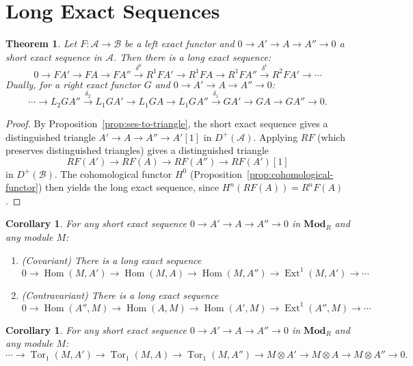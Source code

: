 \documentclass[a4paper,12pt]{book}
\DeclareMathOperator{\Hom}{Hom}
\newcommand{\Mod}{\mathbf{Mod}}
\theoremstyle{definition}
\theoremstyle{plain}
\newtheorem{theorem}[definition]{Theorem}
\newtheorem{corollary}[definition]{Corollary}
\theoremstyle{remark}
\begin{document}
\section{Long Exact Sequences}\label{sec:long-exact-derived}

\begin{theorem}\label{thm:les-derived}
Let $F \colon \mathcal{A} \to \mathcal{B}$ be a left exact functor and
$0 \to A' \to A \to A'' \to 0$ a short exact sequence in $\mathcal{A}$.
Then there is a long exact sequence:
\[
    0 \to FA' \to FA \to FA'' \xrightarrow{\delta^0} R^1 FA' \to R^1 FA \to R^1 FA''
    \xrightarrow{\delta^1} R^2 FA' \to \cdots
\]
Dually, for a right exact functor $G$ and $0 \to A' \to A \to A'' \to 0$:
\[
    \cdots \to L_2 GA'' \xrightarrow{\delta_2} L_1 GA' \to L_1 GA \to L_1 GA''
    \xrightarrow{\delta_1} GA' \to GA \to GA'' \to 0.
\]
\end{theorem}

\begin{proof}
By Proposition~\ref{prop:ses-to-triangle}, the short exact sequence gives a distinguished
triangle $A' \to A \to A'' \to A'[1]$ in $D^+(\mathcal{A})$. Applying $RF$ (which
preserves distinguished triangles) gives a distinguished triangle
\[
    RF(A') \to RF(A) \to RF(A'') \to RF(A')[1]
\]
in $D^+(\mathcal{B})$. The cohomological functor $H^0$ (Proposition~\ref{prop:cohomological-functor})
then yields the long exact sequence, since $H^n(RF(A)) = R^n F(A)$.
\end{proof}

\begin{corollary}\label{cor:ext-les}
For any short exact sequence $0 \to A' \to A \to A'' \to 0$ in $\Mod_R$ and any module $M$:
\begin{enumerate}
    \item (Covariant) There is a long exact sequence
    \[
        0 \to \Hom(M, A') \to \Hom(M, A) \to \Hom(M, A'') \to
        \operatorname{Ext}^1(M, A') \to \cdots
    \]
    \item (Contravariant) There is a long exact sequence
    \[
        0 \to \Hom(A'', M) \to \Hom(A, M) \to \Hom(A', M) \to
        \operatorname{Ext}^1(A'', M) \to \cdots
    \]
\end{enumerate}
\end{corollary}

\begin{corollary}\label{cor:tor-les}
For any short exact sequence $0 \to A' \to A \to A'' \to 0$ in $\Mod_R$ and any module $M$:
\[
    \cdots \to \operatorname{Tor}_1(M, A') \to \operatorname{Tor}_1(M, A) \to
    \operatorname{Tor}_1(M, A'') \to M \otimes A' \to M \otimes A \to M \otimes A'' \to 0.
\]
\end{corollary}
\end{document}
